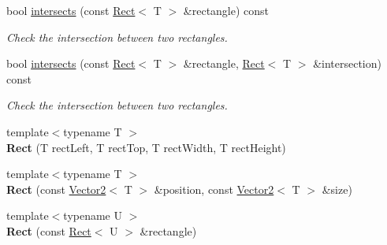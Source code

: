 \begin{DoxyCompactItemize}
bool \hyperlink{classsf_1_1_rect_ad90321b1135cad31589f2db2f9b772db}{intersects} (const \hyperlink{classsf_1_1_rect}{Rect}$<$ T $>$ \&rectangle) const
\begin{DoxyCompactList}\small\item\em Check the intersection between two rectangles. \end{DoxyCompactList}\item 
bool \hyperlink{classsf_1_1_rect_a555557c511ad6bfe0359a97c0ce1a003}{intersects} (const \hyperlink{classsf_1_1_rect}{Rect}$<$ T $>$ \&rectangle, \hyperlink{classsf_1_1_rect}{Rect}$<$ T $>$ \&intersection) const
\begin{DoxyCompactList}\small\item\em Check the intersection between two rectangles. \end{DoxyCompactList}\item 
\mbox{\label{classsf_1_1_rect_a53956cee21c818a3355429e3662fe384}} 
{\footnotesize template$<$typename T $>$ }\\{\bfseries Rect} (T rect\+Left, T rect\+Top, T rect\+Width, T rect\+Height)
\item 
\mbox{\label{classsf_1_1_rect_a7e0ea3f83003ac89b11fd45d581059cc}} 
{\footnotesize template$<$typename T $>$ }\\{\bfseries Rect} (const \hyperlink{classsf_1_1_vector2}{Vector2}$<$ T $>$ \&position, const \hyperlink{classsf_1_1_vector2}{Vector2}$<$ T $>$ \&size)
\item 
\mbox{\label{classsf_1_1_rect_a6fff2bb7e93677839461a66bc2957de0}} 
{\footnotesize template$<$typename U $>$ }\\{\bfseries Rect} (const \hyperlink{classsf_1_1_rect}{Rect}$<$ U $>$ \&rectangle)
\end{DoxyCompactItemize}
